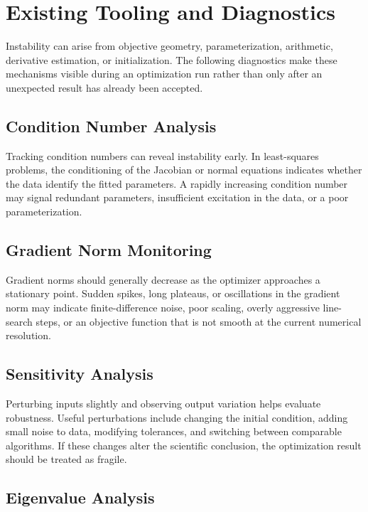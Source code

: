 \section{Existing Tooling and Diagnostics}

Instability can arise from objective geometry, parameterization, arithmetic, derivative estimation, or initialization. The following diagnostics make these mechanisms visible during an optimization run rather than only after an unexpected result has already been accepted.

\subsection{Condition Number Analysis}

Tracking condition numbers can reveal instability early. In least-squares problems, the conditioning of the Jacobian or normal equations indicates whether the data identify the fitted parameters. A rapidly increasing condition number may signal redundant parameters, insufficient excitation in the data, or a poor parameterization.

\subsection{Gradient Norm Monitoring}

Gradient norms should generally decrease as the optimizer approaches a stationary point. Sudden spikes, long plateaus, or oscillations in the gradient norm may indicate finite-difference noise, poor scaling, overly aggressive line-search steps, or an objective function that is not smooth at the current numerical resolution.

\subsection{Sensitivity Analysis}

Perturbing inputs slightly and observing output variation helps evaluate robustness. Useful perturbations include changing the initial condition, adding small noise to data, modifying tolerances, and switching between comparable algorithms. If these changes alter the scientific conclusion, the optimization result should be treated as fragile.

\subsection{Eigenvalue Analysis}

